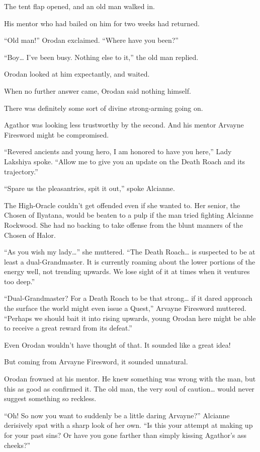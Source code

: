 \documentclass[a4paper,10pt]{book}
\begin{document}
The tent flap opened, and an old man walked in.\par
His mentor who had bailed on him for two weeks had returned.\par
“Old man!” Orodan exclaimed. “Where have you been?”\par
“Boy… I’ve been busy. Nothing else to it,” the old man replied.\par
Orodan looked at him expectantly, and waited.\par
When no further answer came, Orodan said nothing himself.\par
There was definitely some sort of divine strong-arming going on.\par
Agathor was looking less trustworthy by the second. And his mentor Arvayne Firesword might be compromised.\par
“Revered ancients and young hero, I am honored to have you here,” Lady Lakshiya spoke. “Allow me to give you an update on the Death Roach and its trajectory.”\par
“Spare us the pleasantries, spit it out,” spoke Alcianne.\par
The High-Oracle couldn’t get offended even if she wanted to. Her senior, the Chosen of Ilyatana, would be beaten to a pulp if the man tried fighting Alcianne Rockwood. She had no backing to take offense from the blunt manners of the Chosen of Halor.\par
“As you wish my lady…” she muttered. “The Death Roach… is suspected to be at least a dual-Grandmaster. It is currently roaming about the lower portions of the energy well, not trending upwards. We lose sight of it at times when it ventures too deep.”\par
“Dual-Grandmaster? For a Death Roach to be that strong… if it dared approach the surface the world might even issue a Quest,” Arvayne Firesword muttered. “Perhaps we should bait it into rising upwards, young Orodan here might be able to receive a great reward from its defeat.”\par
Even Orodan wouldn’t have thought of that. It sounded like a great idea!\par
But coming from Arvayne Firesword, it sounded unnatural.\par
Orodan frowned at his mentor. He knew something was wrong with the man, but this as good as confirmed it. The old man, the very soul of caution… would never suggest something so reckless.\par
“Oh! So now you want to suddenly be a little daring Arvayne?” Alcianne derisively spat with a sharp look of her own. “Is this your attempt at making up for your past sins? Or have you gone farther than simply kissing Agathor’s ass cheeks?”\par
\end{document}
